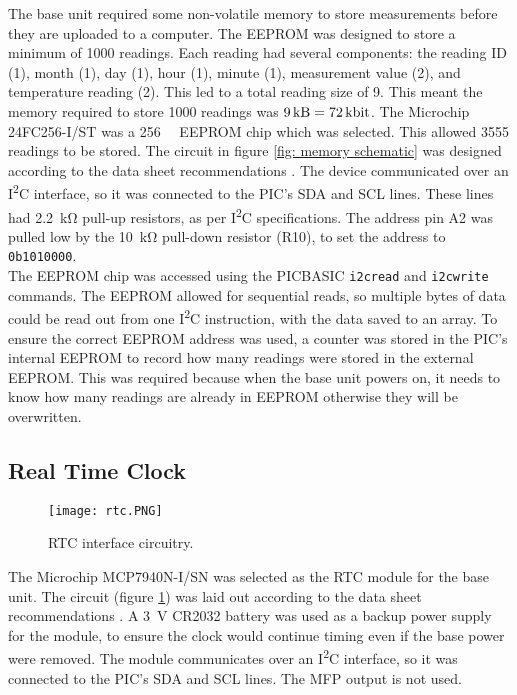 The base unit required some non-volatile memory to store measurements before they are uploaded to a computer. The EEPROM was designed to store a minimum of 1000 readings. Each reading had several components: the reading ID (\SI{1}{\byte}), month (\SI{1}{\byte}), day (\SI{1}{\byte}), hour (\SI{1}{\byte}), minute (\SI{1}{\byte}), measurement value (\SI{2}{\byte}), and temperature reading (\SI{2}{\byte}). This led to a total reading size of \SI{9}{\byte}. This meant the memory required to store 1000 readings was $\SI{9}{\kilo\byte}=\SI{72}{\kilo\bit}$. The Microchip 24FC256-I/ST \cite{memory} was a \SI{256}{\kilo\bit} EEPROM chip which was selected. This allowed 3555 readings to be stored. The circuit in figure \ref{fig: memory schematic} was designed according to the data sheet recommendations \cite{memory}. The device communicated over an I\textsuperscript{2}C interface, so it was connected to the PIC's SDA and SCL lines. These lines had \SI{2.2}{\kilo\ohm} pull-up resistors, as per I\textsuperscript{2}C specifications. The address pin A2 was pulled low by the \SI{10}{\kilo\ohm} pull-down resistor (R10), to set the address to \verb|0b1010000|.\\

The EEPROM chip was accessed using the PICBASIC \verb|i2cread| and \verb|i2cwrite| commands. The EEPROM allowed for sequential reads, so multiple bytes of data could be read out from one I\textsuperscript{2}C instruction, with the data saved to an array. To ensure the correct EEPROM address was used, a counter was stored in the PIC's internal EEPROM to record how many readings were stored in the external EEPROM. This was required because when the base unit powers on, it needs to know how many readings are already in EEPROM otherwise they will be overwritten.





\subsection{Real Time Clock}
\begin{figure}[htb]
	\centering
	\texttt{[image: rtc.PNG]}
	\caption{RTC interface circuitry.}
	\label{fig: rtc schematic}
\end{figure}

The Microchip MCP7940N-I/SN \cite{rtc} was selected as the RTC module for the base unit. The circuit (figure \ref{fig: rtc schematic}) was laid out according to the data sheet recommendations \cite{rtc}. A \SI{3}{\volt} CR2032 battery was used as a backup power supply for the module, to ensure the clock would continue timing even if the base power were removed. The module communicates over an I\textsuperscript{2}C interface, so it was connected to the PIC's SDA and SCL lines. The MFP output is not used.






